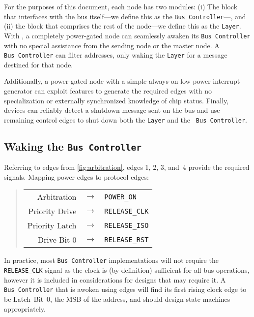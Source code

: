 For the purposes of this document, each \bus node has two modules: (i) The
block that interfaces with the bus itself---we define this as the {\tt Bus
Controller}---, and (ii) the block that comprises the rest of the node---we
define this as the {\tt Layer}. With \bus, a completely power-gated node can
seamlessly awaken its {\tt Bus~Controller} with no special assistance from the
sending node or the master node. A {\tt Bus~Controller} can filter addresses,
only waking the {\tt Layer} for a message destined for that node.

Additionally, a power-gated node with a simple always-on low power interrupt
generator can exploit \bus features to generate the required edges with no
specialization or externally synchronized knowledge of chip status. Finally,
devices can reliably detect a shutdown message sent on the bus and use
remaining control edges to shut down both the {\tt Layer} and the {\tt
Bus~Controller}.

\subsection{Waking the \texttt{Bus~Controller}}
\label{sec:power-bus-controller-wakeup}
Referring to edges from \cref{fig:arbitration}, edges 1, 2, 3, and~4
provide the required signals. Mapping power edges to \bus protocol edges:

\begin{quote}
\begin{tabular}{r c l}
  Arbitration    & $\rightarrow$ & {\tt POWER\_ON} \\
  Priority Drive & $\rightarrow$ & {\tt RELEASE\_CLK} \\
  Priority Latch & $\rightarrow$ & {\tt RELEASE\_ISO} \\
  Drive Bit 0    & $\rightarrow$ & {\tt RELEASE\_RST} \\
\end{tabular}
\end{quote}

In practice, most {\tt Bus~Controller} implementations will not require the
{\tt RELEASE\_CLK} signal as the \bus clock is (by definition) sufficient for
all bus operations, however it is included in considerations for designs that
may require it. A {\tt Bus~Controller} that is awoken using \bus edges will
find its first rising clock edge to be Latch~Bit~0, the MSB of the address,
and should design state machines appropriately.

